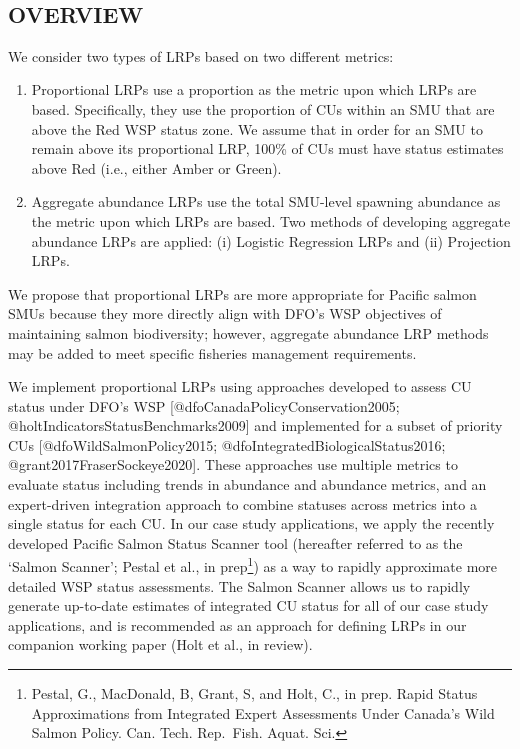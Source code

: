 \documentclass[
]{article}
\begin{document}
~ ~ ~

\hypertarget{overview}{%
\subsection{OVERVIEW}\label{overview}}

We consider two types of LRPs based on two different metrics:

\begin{enumerate}
\def\labelenumi{\arabic{enumi})}
\item
  Proportional LRPs use a proportion as the metric upon which LRPs are
  based. Specifically, they use the proportion of CUs within an SMU that
  are above the Red WSP status zone. We assume that in order for an SMU
  to remain above its proportional LRP, 100\% of CUs must have status
  estimates above Red (i.e., either Amber or Green).
\item
  Aggregate abundance LRPs use the total SMU-level spawning abundance as
  the metric upon which LRPs are based. Two methods of developing
  aggregate abundance LRPs are applied: (i) Logistic Regression LRPs and
  (ii) Projection LRPs.
\end{enumerate}

We propose that proportional LRPs are more appropriate for Pacific
salmon SMUs because they more directly align with DFO's WSP objectives
of maintaining salmon biodiversity; however, aggregate abundance LRP
methods may be added to meet specific fisheries management requirements.

We implement proportional LRPs using approaches developed to assess CU
status under DFO's WSP {[}@dfoCanadaPolicyConservation2005;
@holtIndicatorsStatusBenchmarks2009{]} and implemented for a subset of
priority CUs {[}@dfoWildSalmonPolicy2015;
@dfoIntegratedBiologicalStatus2016; @grant2017FraserSockeye2020{]}.
These approaches use multiple metrics to evaluate status including
trends in abundance and abundance metrics, and an expert-driven
integration approach to combine statuses across metrics into a single
status for each CU. In our case study applications, we apply the
recently developed Pacific Salmon Status Scanner tool (hereafter
referred to as the `Salmon Scanner'; Pestal et al., in prep\footnote{Pestal,
  G., MacDonald, B, Grant, S, and Holt, C., in prep. Rapid Status
  Approximations from Integrated Expert Assessments Under Canada's Wild
  Salmon Policy. Can. Tech. Rep.~Fish. Aquat. Sci.}) as a way to rapidly
approximate more detailed WSP status assessments. The Salmon Scanner
allows us to rapidly generate up-to-date estimates of integrated CU
status for all of our case study applications, and is recommended as an
approach for defining LRPs in our companion working paper (Holt et al.,
in review).
\end{document}
